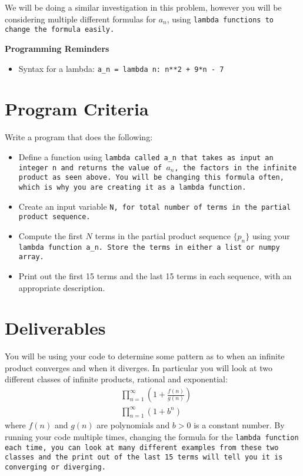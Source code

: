 \documentclass{article}
\def\prog#1{
\vspace{.1in}\begin{mdframed} \begin{center} \textbf{Programming Reminders} \end{center}#1 \end{mdframed} }
\begin{document}
	We will be doing a similar investigation in this problem, however you will be considering multiple different formulas for $a_n$, using \tt{lambda} functions to change the formula easily.
	
	
	
	
	
	
	
	
	
	\prog{
		\begin{itemize}
			\item Syntax for a lambda: \tt{a\_n = lambda n: n**2 + 9*n - 7}
		\end{itemize}
		}




\section*{Program Criteria}
	Write a program that does the following:
	\begin{itemize}
		\item Define a function using \tt{lambda} called \tt{a\_n} that takes as input an integer \tt{n} and returns the value of $a_n$, the factors in the infinite product as seen above.  You will be changing this formula often, which is why you are creating it as a \tt{lambda} function.
		\item Create an input variable \tt{N}, for total number of terms in the partial product sequence.
		\item Compute the first $N$ terms in the partial product sequence $\{p_n\}$ using your \tt{lambda} function \tt{a\_n}.  Store the terms in either a list or numpy array.
		\item Print out the first 15 terms and the last 15 terms in each sequence, with an appropriate description.
	\end{itemize}







\section*{Deliverables}
	You will be using your code to determine some pattern as to when an infinite product converges and when it diverges.  In particular you will look at two different classes of infinite products, rational and exponential:
	\begin{align}
		&\prod_{n=1}^\infty \left(1 + \frac{f(n)}{g(n)} \right) \label{eq:poly}\\
		&\prod_{n=1}^\infty (1 + b^n) \label{eq:exp}
	\end{align}
	where $f(n)$ and $g(n)$ are polynomials and $b>0$ is a constant number.  By running your code multiple times, changing the formula for the \tt{lambda} function each time, you can look at many different examples from these two classes and the print out of the last 15 terms will tell you it is converging or diverging.
	
\end{document}
